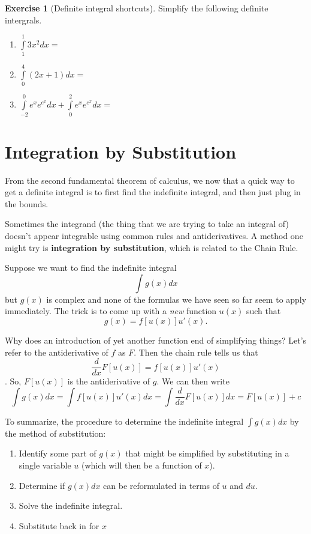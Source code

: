 \documentclass[
]{book}
\providecommand{\tightlist}{%
  \setlength{\itemsep}{0pt}\setlength{\parskip}{0pt}}
\theoremstyle{definition}
\theoremstyle{definition}
\theoremstyle{definition}
\newtheorem{exercise}{Exercise}[chapter]
\theoremstyle{definition}
\theoremstyle{remark}
\begin{document}
\begin{exercise}[Definite integral shortcuts]
\protect\hypertarget{exr:unnamed-chunk-217}{}{\label{exr:unnamed-chunk-217} {} }Simplify the following definite intergrals.

\begin{enumerate}
\def\labelenumi{\arabic{enumi}.}
\tightlist
\item
  \(\int\limits_1^1 3x^2 dx =\)
\item
  \(\int\limits_0^4 (2x+1)dx=\)
\item
  \(\int\limits_{-2}^0 e^x e^{e^x} dx + \int\limits_0^2 e^x e^{e^x} dx =\)
\end{enumerate}
\end{exercise}

\hypertarget{integration-by-substitution}{%
\section{Integration by Substitution}\label{integration-by-substitution}}

From the second fundamental theorem of calculus, we now that a quick way to get a definite integral is to first find the indefinite integral, and then just plug in the bounds.

Sometimes the integrand (the thing that we are trying to take an integral of) doesn't appear integrable using common rules and antiderivatives. A method one might try is \textbf{integration by substitution}, which is related to the Chain Rule.

Suppose we want to find the indefinite integral \[\int g(x)dx\] but \(g(x)\) is complex and none of the formulas we have seen so far seem to apply immediately. The trick is to come up with a \emph{new} function \(u(x)\) such that \[g(x)=f[u(x)]u'(x).\]

Why does an introduction of yet another function end of simplifying things? Let's refer to the antiderivative of \(f\) as \(F\). Then the chain rule tells us that \[\frac{d}{dx} F[u(x)]=f[u(x)]u'(x)\]. So, \(F[u(x)]\) is the antiderivative of \(g\). We can then write \[\int g(x) dx= \int f[u(x)]u'(x)dx = \int \frac{d}{dx} F[u(x)]dx = F[u(x)]+c\]

To summarize, the procedure to determine the indefinite integral \(\int g(x)dx\) by the method of substitution:

\begin{enumerate}
\def\labelenumi{\arabic{enumi}.}
\tightlist
\item
  Identify some part of \(g(x)\) that might be simplified by substituting in a single variable \(u\) (which will then be a function of \(x\)).
\item
  Determine if \(g(x)dx\) can be reformulated in terms of \(u\) and \(du\).
\item
  Solve the indefinite integral.
\item
  Substitute back in for \(x\)
\end{enumerate}
\end{document}
